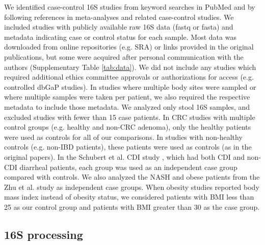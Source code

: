 We identified case-control 16S studies from keyword searches in PubMed and by following references in meta-analyses and related case-control studies.
We included studies with publicly available raw 16S data (fastq or fasta) and metadata indicating case or control status for each sample.
Most data was downloaded from online repositories (e.g. SRA) or links provided in the original publications, but some were acquired after personal communication with the authors (Supplementary Table \ref{tab:data}).
We did not include any studies which required additional ethics committee approvals or authorizations for access (e.g. controlled dbGaP studies).
In studies where multiple body sites were sampled or where multiple samples were taken per patient, we also required the respective metadata to include those metadata.
We analyzed only stool 16S samples, and excluded studies with fewer than 15 case patients.
In CRC studies with multiple control groups (e.g. healthy and non-CRC adenoma), only the healthy patients were used as controls for all of our comparisons.
In studies with non-healthy controls (e.g. non-IBD patients), these patients were used as controls (as in the original papers).
In the Schubert et al. CDI study \cite{cdi-schubert}, which had both CDI and non-CDI diarrheal patients, each group was used as an independent case group compared with controls.
We also analyzed the NASH and obese patients from the Zhu et al. study \cite{nash-baker} as independent case groups.
When obesity studies reported body mass index instead of obesity status, we considered patients with BMI less than 25 as our control group and patients with BMI greater than 30 as the case group.

\subsection{16S processing}

